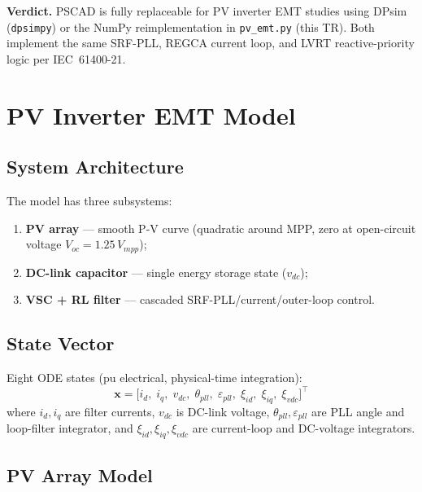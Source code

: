 \documentclass[11pt,a4paper]{article}
\begin{document}
\begin{mdframed}
\textbf{Verdict.}  PSCAD is fully replaceable for PV inverter EMT studies
using DPsim (\texttt{dpsimpy}) or the NumPy reimplementation in
\texttt{pv\_emt.py} (this TR).  Both implement the same SRF-PLL, REGCA
current loop, and LVRT reactive-priority logic per IEC~61400-21.
\end{mdframed}

\section{PV Inverter EMT Model}

\subsection{System Architecture}

The model has three subsystems:
\begin{enumerate}
  \item \textbf{PV array} — smooth P-V curve (quadratic around MPP,
        zero at open-circuit voltage $V_{oc} = 1.25\,V_{mpp}$);
  \item \textbf{DC-link capacitor} — single energy storage state ($v_{dc}$);
  \item \textbf{VSC + RL filter} — cascaded SRF-PLL/current/outer-loop control.
\end{enumerate}

\subsection{State Vector}

Eight ODE states (pu electrical, physical-time integration):
\begin{equation}
  \mathbf{x} = \bigl[i_d,\;i_q,\;v_{dc},\;\theta_{pll},\;\varepsilon_{pll},\;
                \xi_{id},\;\xi_{iq},\;\xi_{vdc}\bigr]^\top
  \label{eq:states}
\end{equation}
where $i_d,i_q$ are filter currents, $v_{dc}$ is DC-link voltage,
$\theta_{pll},\varepsilon_{pll}$ are PLL angle and loop-filter integrator, and
$\xi_{id},\xi_{iq},\xi_{vdc}$ are current-loop and DC-voltage integrators.

\subsection{PV Array Model}
\end{document}
